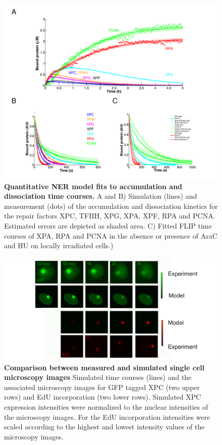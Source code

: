 \begin{figure}[htbp]
	\begin{center}
		\includegraphics[width=1\textwidth]{Abbildungen/figure2_6.pdf}
		\caption{\textbf{Quantitative NER model fits to accumulation and dissociation time courses.} A and B) Simulation (lines) and measurement (dots) of the accumulation and dissociation kinetics for the repair factors XPC, TFIIH, XPG, XPA, XPF, RPA and PCNA. Estimated errors are depicted as shaded area. C) Fitted FLIP time courses of XPA, RPA and PCNA in the absence or presence of AraC and HU on locally irradiated cells.)}
		\label{fig:ModelFit_accu_flip}
	\end{center}
\end{figure}
\begin{figure}[t!]
\begin{center}
\includegraphics[width=1\textwidth]{Abbildungen/figure2_6_2.pdf}
\caption{\textbf{Comparison between measured and simulated single cell microscopy images} Simulated time courses (lines) and the associated microscopy images for GFP tagged XPC (two upper rows) and EdU incorporation (two lower rows). Simulated XPC expression intensities were normalized to the nuclear intensities of the microscopy images. For the EdU incorporation intensities were scaled according to the highest and lowest intensity values of the microscopy images.}
\label{fig:Fitt_accu_Mic}
\end{center}
\end{figure}
